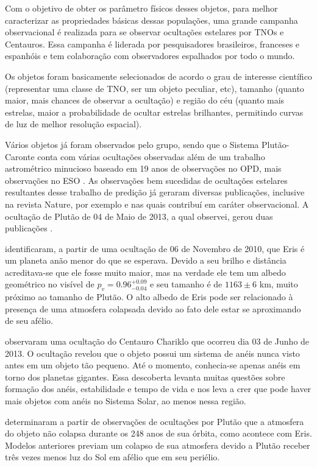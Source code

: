 \documentclass[12pt,a4paper]{monografia}
\begin{document}
\indent \indent Com o objetivo de obter os parâmetro físicos desses objetos, para melhor caracterizar as propriedades básicas dessas populações, uma grande campanha observacional é realizada para se observar ocultações estelares por TNOs e Centauros. Essa campanha é liderada por pesquisadores brasileiros, franceses e espanhóis e tem colaboração com observadores espalhados por todo o mundo.

Os objetos foram basicamente selecionados de acordo o grau de interesse científico (representar uma classe de TNO, ser um  objeto peculiar, etc), tamanho (quanto maior, mais chances de observar a ocultação) e região do céu (quanto mais estrelas, maior  a probabilidade de ocultar estrelas brilhantes, permitindo curvas de luz de melhor resolução espacial).

Vários objetos já foram observados pelo grupo, sendo que o Sistema Plutão-Caronte conta com várias ocultações observadas além de um trabalho astrométrico minucioso baseado em 19 anos de observações no OPD, mais observações no ESO \citep{Rossi2014}. As observações bem sucedidas de ocultações estelares resultantes desse trabalho de predição já geraram diversas publicações, inclusive na revista Nature, por exemplo \cite{Sicardy2011} e \cite{BragaRibas2014} nas quais contribuí em caráter observacional. A ocultação de Plutão de 04 de Maio de 2013, a qual observei, gerou duas publicações \citep{Olkin2015, DiasOliveira2015}.

\cite{Sicardy2011} identificaram, a partir de uma ocultação de 06 de Novembro de 2010, que Eris é um planeta anão menor do que se esperava. Devido a seu brilho e distância acreditava-se que ele fosse muito maior, mas na verdade ele tem um albedo geométrico no visível de $p_v=0.96^{+0.09}_{-0.04}$ e seu tamanho é de $1163 \pm 6$ km, muito próximo ao tamanho de Plutão. O alto albedo de Eris pode ser relacionado à presença de uma atmosfera colapsada devido ao fato dele estar se aproximando de seu afélio.

\cite{BragaRibas2014} observaram uma ocultação do Centauro Chariklo que ocorreu dia 03 de Junho de 2013. O ocultação revelou que o objeto possui um sistema de anéis nunca visto antes em um objeto tão pequeno. Até o momento, conhecia-se apenas anéis em torno dos planetas gigantes. Essa descoberta levanta muitas questões sobre formação dos anéis, estabilidade e tempo de vida e nos leva a crer que pode haver mais objetos com anéis no Sistema Solar, ao menos nessa região.

\cite{Olkin2015} determinaram a partir de observações de ocultações por Plutão que a atmosfera do objeto não colapsa durante os 248 anos de sua órbita, como acontece com Eris. Modelos anteriores previam um colapso de sua atmosfera devido a Plutão receber três vezes menos luz do Sol em afélio que em seu periélio.
\end{document}
